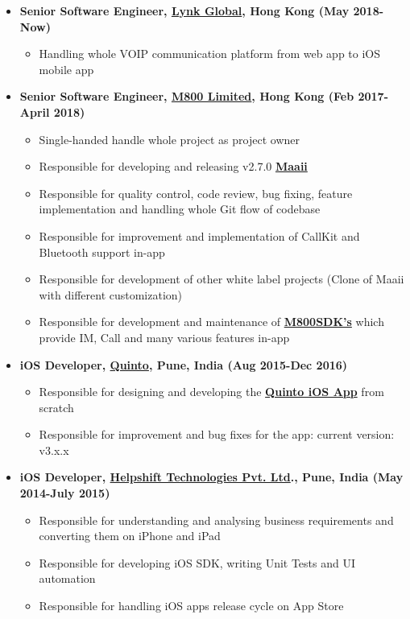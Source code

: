 \documentclass[letterpaper,11pt]{article}
\newcommand{\resitem}[1]{\item #1 \vspace{-2pt}}
\begin{document}
\begin{itemize}

\resitem {{\bfseries Senior Software Engineer, \href{https://lynk.global/en/} {Lynk Global}, Hong Kong (May 2018-Now)}}
		{ \footnotesize
		\begin{itemize}
			\resitem{Handling whole VOIP communication platform from web app to iOS mobile app}
		\end{itemize}
		}

\resitem {{\bfseries Senior Software Engineer, \href{http://www.m800.com} {M800 Limited}, Hong Kong (Feb 2017-April 2018)}}
		{ \footnotesize
		\begin{itemize}
			\resitem{Single-handed handle whole project as project owner}
			\resitem{Responsible for developing and releasing v2.7.0  \href{https://itunes.apple.com/hk/app/id488051175}{\bfseries Maaii}}
			\resitem{Responsible for quality control, code review, bug fixing, feature implementation and handling whole Git flow of codebase}
			\resitem{Responsible for improvement and implementation of CallKit and Bluetooth support in-app}
			\resitem{Responsible for development of other white label projects (Clone of Maaii with different customization)}
			\resitem{Responsible for development and maintenance of \href{https://developer.m800.com/}{\bfseries M800SDK's}  which provide IM, Call and many various features in-app}
		\end{itemize}
		}
\resitem {{\bfseries iOS Developer, \href{http://quintoapp.com} {Quinto}, Pune, India (Aug 2015-Dec 2016)}}
		{ \footnotesize
		\begin{itemize}
			\resitem{Responsible for designing and developing the \href{https://itunes.apple.com/in/app/id912305961}{\bfseries Quinto iOS App} from scratch}
			\resitem{Responsible for improvement and bug fixes for the app: current version: v3.x.x}
		\end{itemize}
		}
\resitem {{\bfseries iOS Developer, \href{https://helpshift.com}{\bfseries Helpshift Technologies Pvt. Ltd}., Pune, India (May 2014-July 2015)}}
		{ \footnotesize
		\begin{itemize}
			\resitem{Responsible for understanding and analysing business requirements and converting them on iPhone and iPad}
			\resitem{Responsible for developing iOS SDK, writing Unit Tests and UI automation}
			\resitem{Responsible for handling iOS apps release cycle on App Store}
		\end{itemize}
		}
\end{itemize}  %
\end{document}
